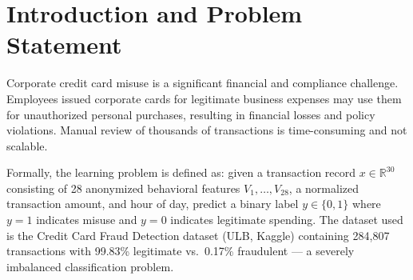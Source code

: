 \documentclass{article}
\begin{document}

\printAffiliationsAndNotice{}

\begin{abstract}
Corporate credit card misuse is a significant financial and compliance
challenge in enterprise settings. This paper presents an end-to-end
machine learning system for detecting fraudulent corporate card
transactions, combining a full ETL pipeline (PostgreSQL, Apache Airflow)
with a five-model comparison (Logistic Regression, LinearSVC, Random
Forest, XGBoost, LightGBM). We use the ULB Credit Card Fraud Detection
dataset (284,807 transactions, 0.17\% fraud) and address severe class
imbalance using SMOTE. Results are served through a FastAPI backend and
React dashboard for production-style deployment.
\end{abstract}

\section{Introduction and Problem Statement}

Corporate credit card misuse is a significant financial and compliance
challenge. Employees issued corporate cards for legitimate business
expenses may use them for unauthorized personal purchases, resulting in
financial losses and policy violations. Manual review of thousands of
transactions is time-consuming and not scalable.

Formally, the learning problem is defined as: given a transaction record
$x \in \mathbb{R}^{30}$ consisting of 28 anonymized behavioral features
$V_1, \ldots, V_{28}$, a normalized transaction amount, and hour of day,
predict a binary label $y \in \{0, 1\}$ where $y = 1$ indicates misuse
and $y = 0$ indicates legitimate spending. The dataset used is the Credit
Card Fraud Detection dataset (ULB, Kaggle) containing 284,807 transactions
with 99.83\% legitimate vs.\ 0.17\% fraudulent --- a severely imbalanced
classification problem.
\end{document}
